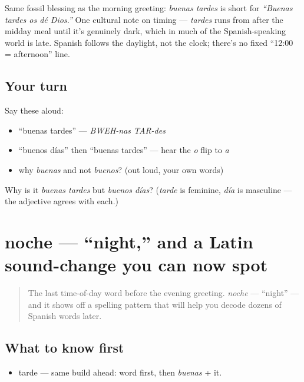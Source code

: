 \begin{culture}
Same fossil blessing as the morning greeting: \emph{buenas tardes} is short for \emph{\textquotedblleft{}Buenas tardes os dé Dios.\textquotedblright{}} One cultural note on timing — \emph{tardes} runs from after the midday meal until it's genuinely dark, which in much of the Spanish-speaking world is late. Spanish follows the daylight, not the clock; there's no fixed \textquotedblleft{}12:00 = afternoon\textquotedblright{} line.
\end{culture}

\subsection*{Your turn}
Say these aloud:

\begin{itemize}
\raggedright
  \item \textquotedblleft{}buenas tardes\textquotedblright{} — \emph{BWEH-nas TAR-des}
  \item \textquotedblleft{}buenos días\textquotedblright{} then \textquotedblleft{}buenas tardes\textquotedblright{} — hear the \emph{o} flip to \emph{a}
  \item why \emph{buenas} and not \emph{buenos}? (out loud, your own words)
\end{itemize}

\begin{tcolorbox}[breakable,colback=teal!4,colframe=teal!35!black,title={Before you move on}]
Why is it \emph{buenas tardes} but \emph{buenos días}? (\emph{tarde} is feminine, \emph{día} is masculine — the adjective agrees with each.)
\end{tcolorbox}
\section[la noche]{noche — \textquotedblleft{}night,\textquotedblright{} and a Latin sound-change you can now spot}

\label{lesson:ES-C02-noche}



\begin{quote}
The last time-of-day word before the evening greeting. \emph{noche} — \textquotedblleft{}night\textquotedblright{} — and it shows off a spelling pattern that will help you decode dozens of Spanish words later.
\end{quote}

\subsection*{What to know first}
\begin{itemize}
\raggedright
  \item tarde — same build ahead: word first, then \emph{buenas} + it.
\end{itemize}

